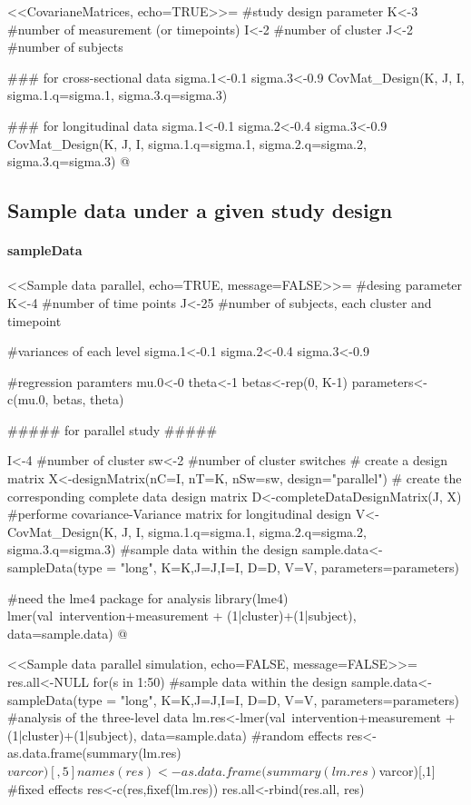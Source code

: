 \documentclass{article}
\begin{document}
<<CovarianeMatrices, echo=TRUE>>=
#study design parameter
K<-3  #number of measurement (or timepoints)
I<-2 #number of cluster
J<-2 #number of subjects

### for cross-sectional data
sigma.1<-0.1
sigma.3<-0.9
CovMat_Design(K, J, I, 
              sigma.1.q=sigma.1, sigma.3.q=sigma.3)
 
### for longitudinal data
sigma.1<-0.1
sigma.2<-0.4
sigma.3<-0.9
CovMat_Design(K, J, I,
              sigma.1.q=sigma.1, sigma.2.q=sigma.2, sigma.3.q=sigma.3)
@



\subsection{Sample data under a given study design}


\paragraph{sampleData}

<<Sample data parallel, echo=TRUE, message=FALSE>>=
#desing parameter
K<-4  #number of  time points
J<-25 #number of subjects, each cluster and timepoint

#variances of each level
sigma.1<-0.1
sigma.2<-0.4
sigma.3<-0.9

#regression paramters
mu.0<-0
theta<-1
betas<-rep(0, K-1)
parameters<-c(mu.0, betas, theta)

##### for parallel study #####

I<-4 #number of cluster
sw<-2 #number of cluster switches
# create a design matrix
X<-designMatrix(nC=I, nT=K, nSw=sw, design="parallel")
# create the corresponding complete data design matrix
D<-completeDataDesignMatrix(J, X)
#performe covariance-Variance matrix for longitudinal design
V<-CovMat_Design(K, J, I, sigma.1.q=sigma.1, sigma.2.q=sigma.2, sigma.3.q=sigma.3)
#sample data within the design
sample.data<-sampleData(type = "long", K=K,J=J,I=I, D=D, V=V, parameters=parameters)

#need the lme4 package for analysis
library(lme4)
lmer(val~intervention+measurement + (1|cluster)+(1|subject), data=sample.data)
@

<<Sample data parallel simulation, echo=FALSE, message=FALSE>>=
res.all<-NULL
for(s in 1:50){
  #sample data within the design
  sample.data<-sampleData(type = "long", K=K,J=J,I=I, D=D, V=V, parameters=parameters)
  #analysis of the three-level data
  lm.res<-lmer(val~intervention+measurement + (1|cluster)+(1|subject), data=sample.data)
  #random effects
  res<-as.data.frame(summary(lm.res)$varcor)[,5]
  names(res)<-as.data.frame(summary(lm.res)$varcor)[,1]
  #fixed effects
  res<-c(res,fixef(lm.res))
  res.all<-rbind(res.all, res)
}
\end{document}
